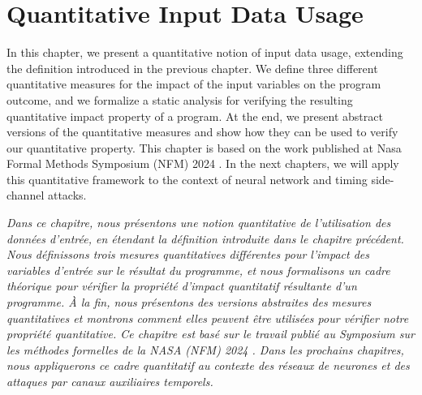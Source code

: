 %

\chapter{Quantitative Input Data Usage}


In this chapter, we present a quantitative notion of input data usage, extending the definition introduced in the previous chapter.
We define three different quantitative measures for the impact of the input variables on the program outcome, and we formalize a static analysis for verifying the resulting quantitative impact property of a program.
At the end, we present abstract versions of the quantitative measures and show how they can be used to verify our quantitative property.
This chapter is based on the work published at Nasa Formal Methods Symposium (NFM) 2024 \cite{Mazzucato2024nfm}.
In the next chapters, we will apply this quantitative framework to the context of neural network and timing side-channel attacks.

\emph{Dans ce chapitre, nous présentons une notion quantitative de l'utilisation des données d'entrée, en étendant la définition introduite dans le chapitre précédent. Nous définissons trois mesures quantitatives différentes pour l'impact des variables d'entrée sur le résultat du programme, et nous formalisons un cadre théorique pour vérifier la propriété d'impact quantitatif résultante d'un programme. À la fin, nous présentons des versions abstraites des mesures quantitatives et montrons comment elles peuvent être utilisées pour vérifier notre propriété quantitative. Ce chapitre est basé sur le travail publié au Symposium sur les méthodes formelles de la NASA (NFM) 2024 . Dans les prochains chapitres, nous appliquerons ce cadre quantitatif au contexte des réseaux de neurones et des attaques par canaux auxiliaires temporels.
}



% 
% 
% 
% 


